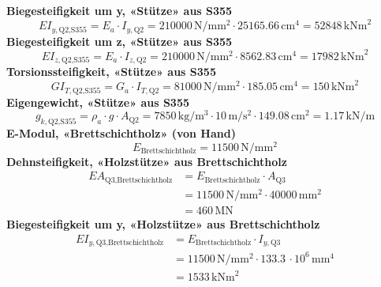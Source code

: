 \documentclass[11pt,a4paper]{article}
\begin{document}
\noindent\textbf{Biegesteifigkeit um y, «Stütze» aus S355}
\begin{equation*}
EI_{y,\text{Q2,S355}} = E_a \cdot I_{y,\text{Q2}} = 210000\,\mathrm{N}/\mathrm{mm}^{2} \cdot 25165.66\,\mathrm{cm}^{4} = 52848\,\mathrm{kNm}^{2}
\end{equation*}
\noindent\textbf{Biegesteifigkeit um z, «Stütze» aus S355}
\begin{equation*}
EI_{z,\text{Q2,S355}} = E_a \cdot I_{z,\text{Q2}} = 210000\,\mathrm{N}/\mathrm{mm}^{2} \cdot 8562.83\,\mathrm{cm}^{4} = 17982\,\mathrm{kNm}^{2}
\end{equation*}
\noindent\textbf{Torsionssteifigkeit, «Stütze» aus S355}
\begin{equation*}
GI_{T,\text{Q2,S355}} = G_a \cdot I_{T,\text{Q2}} = 81000\,\mathrm{N}/\mathrm{mm}^{2} \cdot 185.05\,\mathrm{cm}^{4} = 150\,\mathrm{kNm}^{2}
\end{equation*}
\noindent\textbf{Eigengewicht, «Stütze» aus S355}
\begin{equation*}
g_{k,\text{Q2,S355}} = \rho_a \cdot g \cdot A_{\text{Q2}} = 7850\,\mathrm{kg}/\mathrm{m}^{3} \cdot 10\,\mathrm{m}/\mathrm{s}^{2} \cdot 149.08\,\mathrm{cm}^{2} = 1.17\,\mathrm{kN}/\mathrm{m}
\end{equation*}
\noindent\textbf{E-Modul, «Brettschichtholz» (von Hand)}
\begin{equation*}
E_{\text{Brettschichtholz}} = 11500\,\mathrm{N}/\mathrm{mm}^{2}
\end{equation*}
\noindent\textbf{Dehnsteifigkeit, «Holzstütze» aus Brettschichtholz}
\begin{equation*}
\begin{aligned}
  EA_{\text{Q3,Brettschichtholz}} &= E_{\text{Brettschichtholz}} \cdot A_{\text{Q3}} \\
  &= 11500\,\mathrm{N}/\mathrm{mm}^{2} \cdot 40000\,\mathrm{mm}^{2} \\
  &= 460\,\mathrm{MN}
\end{aligned}
\end{equation*}
\noindent\textbf{Biegesteifigkeit um y, «Holzstütze» aus Brettschichtholz}
\begin{equation*}
\begin{aligned}
  EI_{y,\text{Q3,Brettschichtholz}} &= E_{\text{Brettschichtholz}} \cdot I_{y,\text{Q3}} \\
  &= 11500\,\mathrm{N}/\mathrm{mm}^{2} \cdot 133.3\,\cdot 10^{6}\,\mathrm{mm}^{4} \\
  &= 1533\,\mathrm{kNm}^{2}
\end{aligned}
\end{equation*}
\end{document}
